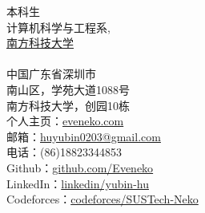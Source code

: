 \documentclass[10pt,a4paper]{article}
\begin{document}
\sloppy  %


\nobreakvspace{0.3em}  %


\begin{multicols}{2}
\noindent 本科生
\\
计算机科学与工程系,
\\
\href{https://www.sustech.edu.cn/}{南方科技大学}
\\
\\
中国广东省深圳市
\\
南山区，学苑大道1088号
\\
南方科技大学，创园10栋
\\
个人主页：\href{https://eveneko.com}{eveneko.com}
\\
邮箱：\noindent\href{mailto:huyubin0203@gmail.com}{huyubin0203\mbox{}@\mbox{}gmail.com}
\\
电话：\textsmaller{+}(86)18823344853
\\
Github：\href{https://github.com/Eveneko}{github.com/Eveneko}
\\
LinkedIn：\href{https://www.linkedin.com/in/yubin-hu-7855861a0/}{linkedin/yubin-hu}
\\
Codeforces：\href{http://codeforces.com/profile/SUSTech-Neko}{codeforces/SUSTech-Neko}
\end{multicols}



\end{document}
